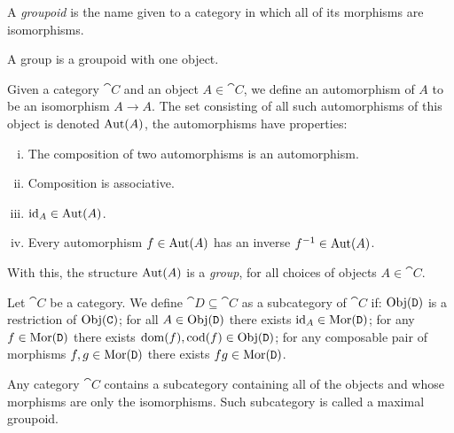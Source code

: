 \begin{definition}[Groupoids]\label{def: groupoids}
    A \emph{groupoid} is the name given to a category in which all of its
    morphisms are isomorphisms.
\end{definition}

\begin{definition}[Group]\label{def: group}
    A group is a groupoid with one object.
\end{definition}

\begin{definition}[Automorphism]
    Given a category \(\cat C\) and an object  \(A \in \cat C\), we define an
    automorphism of \(A\) to be an isomorphism \(A \to A\). The set consisting of
    all such automorphisms of this object is denoted \(\operatorname{Aut}(A)\), the
    automorphisms have properties:
    \begin{enumerate}[i.]
        \item The composition of two automorphisms is an automorphism.
        \item Composition is associative.
        \item \(\operatorname{id}_A \in \operatorname{Aut}(A)\).
        \item Every automorphism \(f \in \operatorname{Aut}(A)\) has an inverse \(f^{-1}
              \in \operatorname{Aut}(A)\).
    \end{enumerate}
    With this, the structure \(\operatorname{Aut}(A)\) is a \emph{group}, for all choices of
    objects \(A \in \cat{C}\).
\end{definition}

\begin{definition}[Subcategory]\label{def: subcategory}
    Let \(\cat C\) be a category. We define \(\cat D \subseteq \cat C\) as a
    subcategory of \(\cat C\) if: \(\operatorname{Obj}(\texttt D)\) is a restriction of \(\operatorname{Obj}(\texttt
    C)\); for all \(A \in \operatorname{Obj}(\texttt D)\) there exists \(\operatorname{id}_A \in \operatorname{Mor}(\texttt D)\);
    for any \(f \in \operatorname{Mor}(\texttt D)\) there exists \(\operatorname{dom}(f), \operatorname{cod}(f) \in
    \operatorname{Obj}(\texttt D)\); for any composable pair of morphisms \(f, g \in \operatorname{Mor}(\texttt D)\)
    there exists \(f g \in \operatorname{Mor}(\texttt D)\).
\end{definition}

\begin{lemma}
    Any category \(\cat C\) contains a subcategory containing all of the objects
    and whose morphisms are only the isomorphisms. Such subcategory is called a
    maximal groupoid.
\end{lemma}

